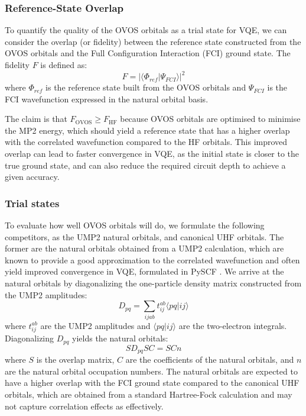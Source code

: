 \subsubsection{Reference-State Overlap}

To quantify the quality of the OVOS orbitals as a trial state for VQE, we can consider the overlap (or fidelity) between the reference state constructed from the OVOS orbitals and the Full Configuration Interaction (FCI) ground state. The fidelity $F$ is defined as: 
\begin{equation}
    F = |\langle \Phi_{ref} | \Psi_{FCI} \rangle|^2
\end{equation}
where $\Phi_{ref}$ is the reference state built from the OVOS orbitals and $\Psi_{FCI}$ is the FCI wavefunction expressed in the natural orbital basis. 

The claim is that $F_{\text{OVOS}} \geq F_{\text{HF}}$ because OVOS orbitals are optimised to minimise the MP2 energy, which should yield a reference state that has a higher overlap with the correlated wavefunction compared to the HF orbitals. This improved overlap can lead to faster convergence in VQE, as the initial state is closer to the true ground state, and can also reduce the required circuit depth to achieve a given accuracy.

\subsubsection{Trial states}

To evaluate how well OVOS orbitals will do, we formulate the following competitors, as the UMP2 natural orbitals, and canonical UHF orbitals. 
The former are the natural orbitals obtained from a UMP2 calculation, which are known to provide a good approximation to the correlated wavefunction and often yield improved convergence in VQE, formulated in PySCF \cite{Sun2020}. We arrive at the natural orbitals by diagonalizing the one-particle density matrix constructed from the UMP2 amplitudes:
\begin{equation}
    D_{pq} = \sum_{ijab} t_{ij}^{ab} \langle pq | ij \rangle
\end{equation}
where $t_{ij}^{ab}$ are the UMP2 amplitudes and $\langle pq | ij \rangle$ are the two-electron integrals. Diagonalizing $D_{pq}$ yields the natural orbitals:
\begin{equation}
    S D_{pq} S C = S C n
\end{equation}
where $S$ is the overlap matrix, $C$ are the coefficients of the natural orbitals, and $n$ are the natural orbital occupation numbers. The natural orbitals are expected to have a higher overlap with the FCI ground state compared to the canonical UHF orbitals, which are obtained from a standard Hartree-Fock calculation and may not capture correlation effects as effectively.

